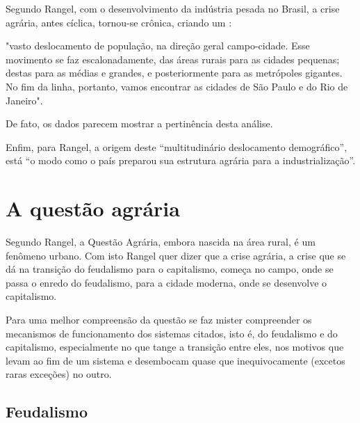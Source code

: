 \documentclass[
	12pt,				%
	oneside,			%
	a4paper,			%
	chapter=TITLE,		%
	section=TITLE,		%
	english,			%
	brazil				%
	]{abntex2}
\begin{document}
\begin{refsection}
Segundo Rangel, com o desenvolvimento da indústria pesada no Brasil, a crise
agrária, antes cíclica, tornou-se crônica, criando um \autocite*[156-157]{rangel1988}:
\begin{citacao}
"vasto deslocamento de população, na direção geral campo-cidade. Esse movimento
se faz escalonadamente, das áreas rurais para as cidades pequenas; destas para
as médias e grandes, e posteriormente para as metrópoles gigantes. No fim da
linha, portanto, vamos encontrar as cidades de São Paulo e do Rio de Janeiro".
\end{citacao}
De fato, os dados parecem mostrar a pertinência desta análise.

Enfim, para Rangel, a origem deste ``multitudinário deslocamento demográfico'',
está ``o modo como o país preparou sua estrutura agrária para a industrialização''.

\hypertarget{a-questuxe3o-agruxe1ria}{%
\section{A questão agrária}\label{a-questuxe3o-agruxe1ria}}

Segundo Rangel, a Questão Agrária, embora nascida na área rural, é um fenômeno
urbano. Com isto Rangel quer dizer que a crise agrária, a crise que se dá na
transição do feudalismo para o capitalismo, começa no campo, onde se passa o
enredo do feudalismo, para a cidade moderna, onde se desenvolve o capitalismo.

Para uma melhor compreensão da questão se faz mister compreender os mecanismos
de funcionamento dos sistemas citados, isto é, do feudalismo e do capitalismo,
especialmente no que tange a transição entre eles, nos motivos que levam ao
fim de um sistema e desembocam quase que inequivocamente (excetos raras
exceções) no outro.

\hypertarget{feudalismo}{%
\subsection{Feudalismo}\label{feudalismo}}


\end{refsection}
\end{document}
